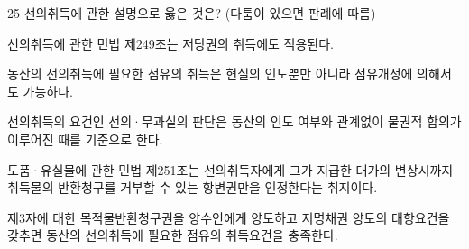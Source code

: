 \begin{question}{25}
선의취득에 관한 설명으로 옳은 것은? (다툼이 있으면 판례에 따름)
\begin{choices}
  \item 선의취득에 관한 민법 제249조는 저당권의 취득에도 적용된다.
  \item 동산의 선의취득에 필요한 점유의 취득은 현실의 인도뿐만 아니라 점유개정에 의해서도 가능하다.
  \item 선의취득의 요건인 선의·무과실의 판단은 동산의 인도 여부와 관계없이 물권적 합의가 이루어진 때를 기준으로 한다.
  \item 도품·유실물에 관한 민법 제251조는 선의취득자에게 그가 지급한 대가의 변상시까지 취득물의 반환청구를 거부할 수 있는 항변권만을 인정한다는 취지이다.
  \item 제3자에 대한 목적물반환청구권을 양수인에게 양도하고 지명채권 양도의 대항요건을 갖추면 동산의 선의취득에 필요한 점유의 취득요건을 충족한다.
\end{choices}
\end{question}
